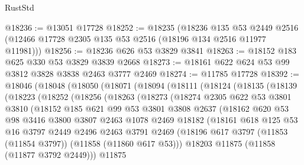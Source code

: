 \begin{lexlean}{RustStd}
\begin{coremodule}
@18236 := @13051 @17728
@18252 := @18235
    (@18236
      @135
      @53
      @2449
      @2516
      (@12466 @17728 @2305 @135 @53 @2516 (@18196 @134 @2516 @11977 @11981)))
@18256 := @18236 @626 @53 @3829 @3841
@18263 := @18152 @183 @625 @330 @53 @3829 @3839 @2668
@18273 := @18161 @622 @624 @53 @99 @3812 @3828 @3838 @2463 @3777 @2469
@18274 := @11785 @17728
@18392 := @18046
    (@18048
      (@18050
        (@18071
          (@18094
            (@18111
              (@18124
                (@18135
                  (@18139
                    (@18223
                      (@18252
                        (@18256
                          (@18263
                            (@18273
                              (@18274
                                @2305
                                @622
                                @53
                                @3801
                                @3810
                                (@18152
                                  @185
                                  @621
                                  @99
                                  @53
                                  @3801
                                  @3808
                                  @2637
                                  (@18162
                                    @620
                                    @53
                                    @98
                                    @3416
                                    @3800
                                    @3807
                                    @2463
                                    @1078
                                    @2469
                                    @18182
                                    (@18161
                                      @618
                                      @125
                                      @53
                                      @16
                                      @3797
                                      @2449
                                      @2496
                                      @2463
                                      @3791
                                      @2469
                                      (@18196
                                        @617
                                        @3797
                                        (@11853 (@11854 @3797))
                                        (@11858 (@11860 @617 @53)))
                                      @18203
                                      @11875
                                      (@11858 (@11877 @3792 @2449)))
                                    @11875

\end{coremodule}
\end{lexlean}
